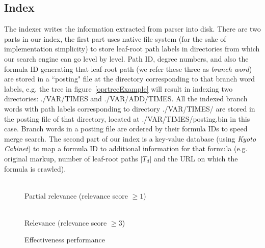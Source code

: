 \documentclass{acm_proc_article-sp}
\begin{document}
\subsection{Index}
The indexer writes the information extracted from parser into disk. 
There are two parts in our index, the first part uses native file system (for the sake of implementation simplicity) to store leaf-root path labels in directories from which our search engine can go level by level. 
Path ID, degree numbers, and also the formula ID generating that leaf-root path (we refer these three as \textit{branch word}) are stored in a ``posting" file at the directory corresponding to that branch word labels, 
e.g. the tree in figure~\ref{oprtreeExample} will result in indexing two directories: ./VAR/TIMES and ./VAR/ADD/TIMES. 
All the indexed branch words with path labels corresponding to directory ./VAR/TIMES/ are stored in the posting file of that directory, located at ./VAR/TIMES/posting.bin in this case.
Branch words in a posting file are ordered by their formula IDs to speed merge search.
The second part of our index is a key-value database (using \textit{Kyoto Cabinet}) to map a formula ID to additional information for that formula (e.g. original markup, number of leaf-root paths $|T_d|$ and the URL on which the formula is crawled).

\begin{figure*}
\begin{minipage}[b]{3.40in}
\begin{center}
\\Partial relevance (relevance score $\ge 1$) 
\end{center}
\end{minipage}
\hspace*{0in}
\begin{minipage}[b]{3.40in}
\begin{center}
\\Relevance (relevance score $\ge 3$)
\end{center}
\end{minipage}
\caption{Effectiveness performance}\label{perfcomp}
\end{figure*}
\end{document}
